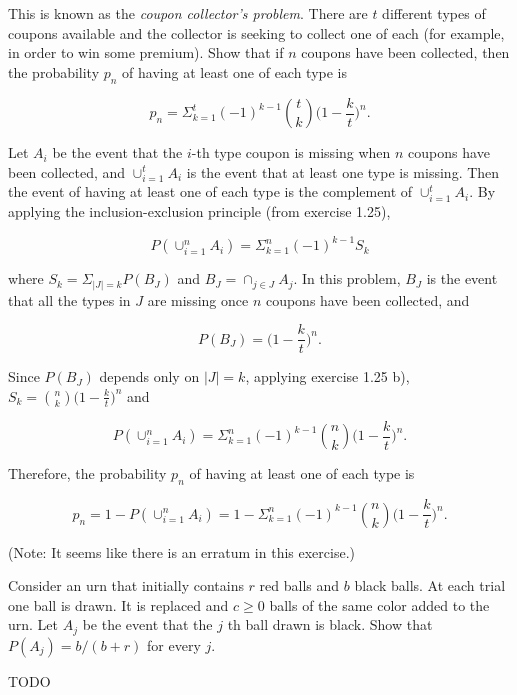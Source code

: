 \begin{exercise}
  This is known as the \textit{coupon collector's problem}. There are $t$ different types of coupons available and the collector is seeking to collect one of each (for example, in order to win some premium). Show that if $n$ coupons have been collected, then the probability $p_n$ of having at least one of each type is

  \[ p_n = \Sigma_{k=1}^t(-1)^{k-1}\binom{t}{k}\Big(1 - \frac{k}{t}\Big)^n .\]
\end{exercise}
\begin{solution}
  Let $A_i$ be the event that the $i$-th type coupon is missing when $n$ coupons have been collected, and $\cup_{i=1}^t A_i$ is the event that at least one type is missing. Then the event of having at least one of each type is the complement of $\cup_{i=1}^t A_i$. By applying the inclusion-exclusion principle (from exercise 1.25),

  \[ P(\cup_{i=1}^n A_i) = \Sigma_{k=1}^n(-1)^{k-1}S_k \]

  where $S_k=\Sigma_{|J|=k}P(B_J)$ and $B_J=\cap_{j\in J}A_j$. In this problem, $B_J$ is the event that all the types in $J$ are missing once $n$ coupons have been collected, and

  \[ P(B_J) = \Big(1 - \frac{k}{t} \Big)^n .\]

  Since $P(B_J)$ depends only on $|J|=k$, applying exercise 1.25 b), $S_k = \binom{n}{k}\Big(1 - \frac{k}{t} \Big)^n$ and

  \[ P(\cup_{i=1}^n A_i) = \Sigma_{k=1}^n(-1)^{k-1}\binom{n}{k}\Big(1 - \frac{k}{t} \Big)^n .\]

  Therefore, the probability $p_n$ of having at least one of each type is

  \[ p_n = 1 - P(\cup_{i=1}^n A_i) = 1 - \Sigma_{k=1}^n(-1)^{k-1}\binom{n}{k}\Big(1 - \frac{k}{t} \Big)^n. \]

  (Note: It seems like there is an erratum in this exercise.)
\end{solution}


\begin{exercise}
  Consider an urn that initially contains $r$ red balls and $b$ black balls. At each trial one ball is drawn. It is replaced and $c\geq 0$ balls of the same color added to the urn. Let $A_j$ be the event that the $j$ th ball drawn is black. Show that $P(A_j)=b/(b+r)$ for every $j$.
\end{exercise}
\begin{solution}
  TODO
\end{solution}
